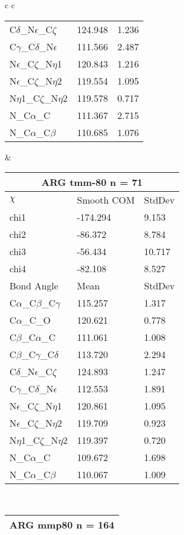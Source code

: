 \begin{longtable}{ c c }
\begin{tabular}{ l l l }
  C$\delta$\_N$\epsilon$\_C$\zeta$ & 124.948 & 1.236\\
  C$\gamma$\_C$\delta$\_N$\epsilon$ & 111.566 & 2.487\\
  N$\epsilon$\_C$\zeta$\_N$\eta$1 & 120.843 & 1.216\\
  N$\epsilon$\_C$\zeta$\_N$\eta$2 & 119.554 & 1.095\\
  N$\eta$1\_C$\zeta$\_N$\eta$2 & 119.578 & 0.717\\
  N\_C$\alpha$\_C & 111.367 & 2.715\\
  N\_C$\alpha$\_C$\beta$ & 110.685 & 1.076\\
  \bottomrule
  \end{tabular}
  &
  \begin{tabular}{ l l l }
  \toprule
  \multicolumn{3}{c}{ARG \textbf{tmm-80} n = 71} \\ \toprule
  $\chi$       & Smooth COM & StdDev \\ \midrule
  chi1 & -174.294 & 9.153 \\ 
  chi2 & -86.372 & 8.784 \\ 
  chi3 & -56.434 & 10.717 \\ 
  chi4 & -82.108 & 8.527 \\ \midrule
  Bond Angle   & Mean     & StdDev \\ \midrule
  C$\alpha$\_C$\beta$\_C$\gamma$ & 115.257 & 1.317\\
  C$\alpha$\_C\_O & 120.621 & 0.778\\
  C$\beta$\_C$\alpha$\_C & 111.061 & 1.008\\
  C$\beta$\_C$\gamma$\_C$\delta$ & 113.720 & 2.294\\
  C$\delta$\_N$\epsilon$\_C$\zeta$ & 124.893 & 1.247\\
  C$\gamma$\_C$\delta$\_N$\epsilon$ & 112.553 & 1.891\\
  N$\epsilon$\_C$\zeta$\_N$\eta$1 & 120.861 & 1.095\\
  N$\epsilon$\_C$\zeta$\_N$\eta$2 & 119.709 & 0.923\\
  N$\eta$1\_C$\zeta$\_N$\eta$2 & 119.397 & 0.720\\
  N\_C$\alpha$\_C & 109.672 & 1.698\\
  N\_C$\alpha$\_C$\beta$ & 110.067 & 1.009\\
  \bottomrule
  \end{tabular}
  \\
  \begin{tabular}{ l l l }
  \toprule
  \multicolumn{3}{c}{ARG \textbf{mmp80} n = 164} \\ \toprule

\end{tabular}
\end{longtable}
